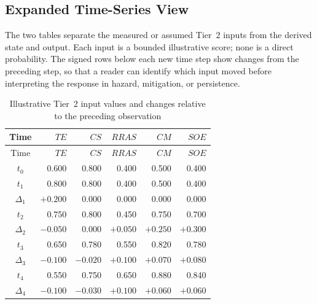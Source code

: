 \documentclass[11pt]{article}
\begin{document}
\subsection{Expanded Time-Series View}
The two tables separate the measured or assumed Tier~2 inputs from
the derived state and output. Each input is a bounded illustrative
score; none is a direct probability. The signed rows below each
new time step show changes from the preceding step, so that a
reader can identify which input moved before interpreting the
response in hazard, mitigation, or persistence.

\begingroup
\small
\setlength{\tabcolsep}{6pt}
\renewcommand{\arraystretch}{1.10}
\begin{longtable}{c r r r r r}
\caption{Illustrative Tier~2 input values and changes relative to the preceding observation}
\label{tab:worked-inputs}\\
\toprule
Time & $TE$ & $CS$ & $RRAS$ & $CM$ & $SOE$ \\
\midrule
\endfirsthead
\toprule
Time & $TE$ & $CS$ & $RRAS$ & $CM$ & $SOE$ \\
\midrule
\endhead
$t_0$ & 0.600 & 0.800 & 0.400 & 0.500 & 0.400 \\
$t_1$ & 0.800 & 0.800 & 0.400 & 0.500 & 0.400 \\
$\Delta_1$ & $+0.200$ & $0.000$ & $0.000$ & $0.000$ & $0.000$ \\
$t_2$ & 0.750 & 0.800 & 0.450 & 0.750 & 0.700 \\
$\Delta_2$ & $-0.050$ & $0.000$ & $+0.050$ & $+0.250$ & $+0.300$ \\
$t_3$ & 0.650 & 0.780 & 0.550 & 0.820 & 0.780 \\
$\Delta_3$ & $-0.100$ & $-0.020$ & $+0.100$ & $+0.070$ & $+0.080$ \\
$t_4$ & 0.550 & 0.750 & 0.650 & 0.880 & 0.840 \\
$\Delta_4$ & $-0.100$ & $-0.030$ & $+0.100$ & $+0.060$ & $+0.060$ \\
\bottomrule
\end{longtable}
\endgroup
\end{document}
